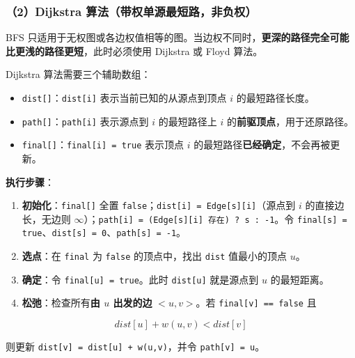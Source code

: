 \documentclass[11pt,openany,UTF8]{ctexbook}
\begin{document}
\subsubsection{（2）Dijkstra 算法（带权单源最短路，非负权）}

BFS 只适用于无权图或各边权值相等的图。当边权不同时，\textbf{更深的路径完全可能比更浅的路径更短}，此时必须使用 Dijkstra 或 Floyd 算法。

Dijkstra 算法需要三个辅助数组：

\begin{itemize}
\item \texttt{dist[]\allowbreak{}}：\texttt{dist[i]\allowbreak{}} 表示当前已知的从源点到顶点 $i$ 的最短路径长度。
\item \texttt{path[]\allowbreak{}}：\texttt{path[i]\allowbreak{}} 表示源点到 $i$ 的最短路径上 $i$ 的\textbf{前驱顶点}，用于还原路径。
\item \texttt{final[]\allowbreak{}}：\texttt{final[i]\allowbreak{} =\allowbreak{} true} 表示顶点 $i$ 的最短路径\textbf{已经确定}，不会再被更新。
\end{itemize}
\textbf{执行步骤}：

\begin{enumerate}
\item \textbf{初始化}：\texttt{final[]\allowbreak{}} 全置 \texttt{false}；\texttt{dist[i]\allowbreak{} =\allowbreak{} Edge[s]\allowbreak{}[i]\allowbreak{}}（源点到 $i$ 的直接边长，无边则 $\infty$）；\texttt{path[i]\allowbreak{} =\allowbreak{} (Edge[s]\allowbreak{}[i]\allowbreak{} 存在)\allowbreak{} ? s :\allowbreak{} -1}。令 \texttt{final[s]\allowbreak{} =\allowbreak{} true}、\texttt{dist[s]\allowbreak{} =\allowbreak{} 0}、\texttt{path[s]\allowbreak{} =\allowbreak{} -1}。
\item \textbf{选点}：在 \texttt{final} 为 \texttt{false} 的顶点中，找出 \texttt{dist} 值最小的顶点 $u$。
\item \textbf{确定}：令 \texttt{final[u]\allowbreak{} =\allowbreak{} true}。此时 \texttt{dist[u]\allowbreak{}} 就是源点到 $u$ 的最短距离。
\item \textbf{松弛}：检查所有\textbf{由 $u$ 出发的边} $<u,v>$。若 \texttt{final[v]\allowbreak{} =\allowbreak{}=\allowbreak{} false} 且
\end{enumerate}
\[dist[u]+w(u,v) < dist[v]\]

则更新 \texttt{dist[v]\allowbreak{} =\allowbreak{} dist[u]\allowbreak{} +\allowbreak{} w(u,\allowbreak{}v)\allowbreak{}}，并令 \texttt{path[v]\allowbreak{} =\allowbreak{} u}。
\end{document}
